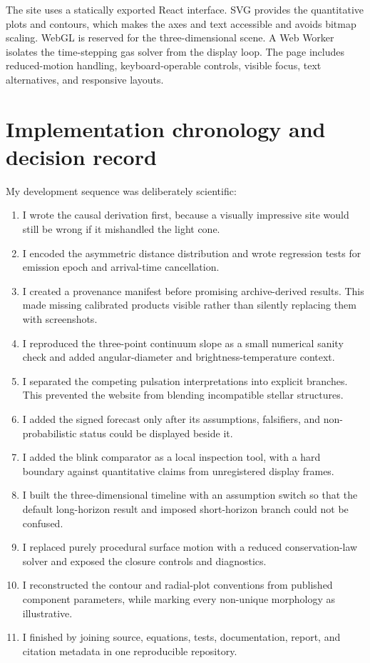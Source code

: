 \documentclass[11pt,a4paper]{article}
\begin{document}
The site uses a statically exported React interface. SVG provides the quantitative plots and contours, which makes the axes and text accessible and avoids bitmap scaling. WebGL is reserved for the three-dimensional scene. A Web Worker isolates the time-stepping gas solver from the display loop. The page includes reduced-motion handling, keyboard-operable controls, visible focus, text alternatives, and responsive layouts.

\section{Implementation chronology and decision record}

My development sequence was deliberately scientific:

\begin{enumerate}
  \item I wrote the causal derivation first, because a visually impressive site would still be wrong if it mishandled the light cone.
  \item I encoded the asymmetric distance distribution and wrote regression tests for emission epoch and arrival-time cancellation.
  \item I created a provenance manifest before promising archive-derived results. This made missing calibrated products visible rather than silently replacing them with screenshots.
  \item I reproduced the three-point continuum slope as a small numerical sanity check and added angular-diameter and brightness-temperature context.
  \item I separated the competing pulsation interpretations into explicit branches. This prevented the website from blending incompatible stellar structures.
  \item I added the signed forecast only after its assumptions, falsifiers, and non-probabilistic status could be displayed beside it.
  \item I added the blink comparator as a local inspection tool, with a hard boundary against quantitative claims from unregistered display frames.
  \item I built the three-dimensional timeline with an assumption switch so that the default long-horizon result and imposed short-horizon branch could not be confused.
  \item I replaced purely procedural surface motion with a reduced conservation-law solver and exposed the closure controls and diagnostics.
  \item I reconstructed the contour and radial-plot conventions from published component parameters, while marking every non-unique morphology as illustrative.
  \item I finished by joining source, equations, tests, documentation, report, and citation metadata in one reproducible repository.
\end{enumerate}
\end{document}
